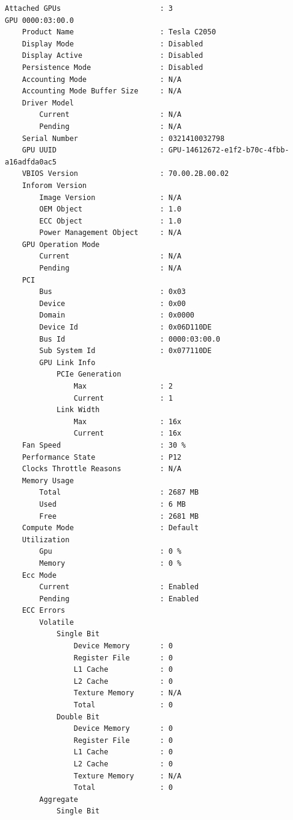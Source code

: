 \begin{enumerate}
\begin{verbatim}
Attached GPUs                       : 3
GPU 0000:03:00.0
    Product Name                    : Tesla C2050
    Display Mode                    : Disabled
    Display Active                  : Disabled
    Persistence Mode                : Disabled
    Accounting Mode                 : N/A
    Accounting Mode Buffer Size     : N/A
    Driver Model
        Current                     : N/A
        Pending                     : N/A
    Serial Number                   : 0321410032798
    GPU UUID                        : GPU-14612672-e1f2-b70c-4fbb-a16adfda0ac5
    VBIOS Version                   : 70.00.2B.00.02
    Inforom Version
        Image Version               : N/A
        OEM Object                  : 1.0
        ECC Object                  : 1.0
        Power Management Object     : N/A
    GPU Operation Mode
        Current                     : N/A
        Pending                     : N/A
    PCI
        Bus                         : 0x03
        Device                      : 0x00
        Domain                      : 0x0000
        Device Id                   : 0x06D110DE
        Bus Id                      : 0000:03:00.0
        Sub System Id               : 0x077110DE
        GPU Link Info
            PCIe Generation
                Max                 : 2
                Current             : 1
            Link Width
                Max                 : 16x
                Current             : 16x
    Fan Speed                       : 30 %
    Performance State               : P12
    Clocks Throttle Reasons         : N/A
    Memory Usage
        Total                       : 2687 MB
        Used                        : 6 MB
        Free                        : 2681 MB
    Compute Mode                    : Default
    Utilization
        Gpu                         : 0 %
        Memory                      : 0 %
    Ecc Mode
        Current                     : Enabled
        Pending                     : Enabled
    ECC Errors
        Volatile
            Single Bit            
                Device Memory       : 0
                Register File       : 0
                L1 Cache            : 0
                L2 Cache            : 0
                Texture Memory      : N/A
                Total               : 0
            Double Bit            
                Device Memory       : 0
                Register File       : 0
                L1 Cache            : 0
                L2 Cache            : 0
                Texture Memory      : N/A
                Total               : 0
        Aggregate
            Single Bit            

\end{verbatim}
\end{enumerate}
